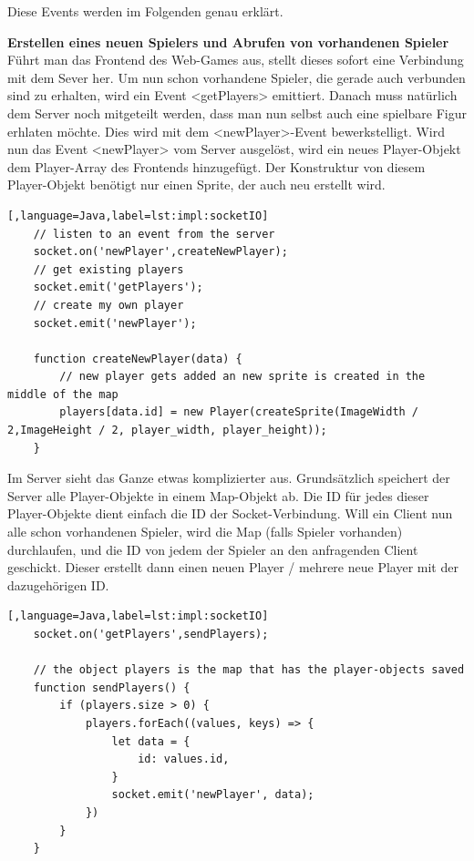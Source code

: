 Diese Events werden im Folgenden genau erklärt. 

\textbf{Erstellen eines neuen Spielers und Abrufen von vorhandenen Spieler} \\
Führt man das Frontend des Web-Games aus, stellt dieses sofort eine Verbindung mit dem Sever her. Um nun schon vorhandene Spieler, die gerade auch verbunden sind zu erhalten, wird ein Event <getPlayers> emittiert.
Danach muss natürlich dem Server noch mitgeteilt werden, dass man nun selbst auch eine spielbare Figur erhlaten möchte. Dies wird mit dem <newPlayer>-Event bewerkstelligt.
Wird nun das Event <newPlayer> vom Server ausgelöst, wird ein neues Player-Objekt dem Player-Array des Frontends hinzugefügt. Der Konstruktur von diesem Player-Objekt benötigt nur einen Sprite, der auch neu erstellt wird.
\begin{lstlisting}[,language=Java,label=lst:impl:socketIO]
    // listen to an event from the server
    socket.on('newPlayer',createNewPlayer);
    // get existing players
    socket.emit('getPlayers');
    // create my own player
    socket.emit('newPlayer');

    function createNewPlayer(data) {
        // new player gets added an new sprite is created in the middle of the map
        players[data.id] = new Player(createSprite(ImageWidth / 2,ImageHeight / 2, player_width, player_height));
    }
\end{lstlisting}

Im Server sieht das Ganze etwas komplizierter aus. Grundsätzlich speichert der Server alle Player-Objekte in einem Map-Objekt ab.
Die ID für jedes dieser Player-Objekte dient einfach die ID der Socket-Verbindung. Will ein Client nun alle schon vorhandenen Spieler, wird die Map (falls Spieler vorhanden) durchlaufen, und die ID von jedem der Spieler an den anfragenden Client geschickt.
Dieser erstellt dann einen neuen Player / mehrere neue Player mit der dazugehörigen ID.

\begin{lstlisting}[,language=Java,label=lst:impl:socketIO]
    socket.on('getPlayers',sendPlayers);

    // the object players is the map that has the player-objects saved
    function sendPlayers() {
        if (players.size > 0) {
            players.forEach((values, keys) => {
                let data = {
                    id: values.id,
                }
                socket.emit('newPlayer', data);
            })
        }
    }
\end{lstlisting}

